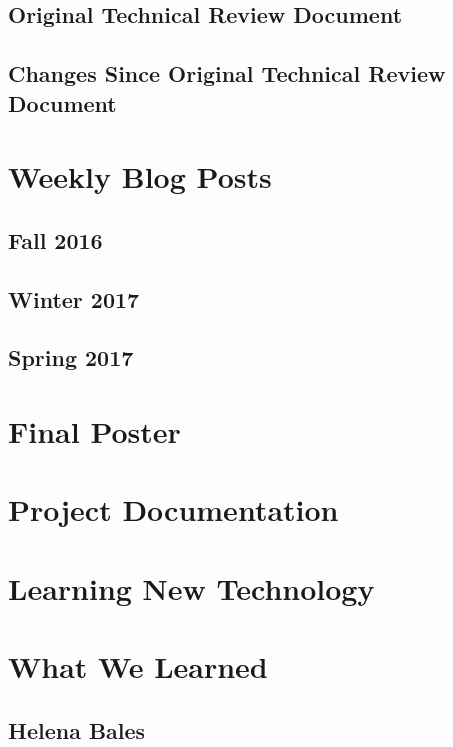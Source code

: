 \documentclass[letterpaper,10pt]{article}
\begin{document}
\subsection{Original Technical Review Document}


\subsection{Changes Since Original Technical Review Document}


\section{Weekly Blog Posts}
\subsection{Fall 2016}


\subsection{Winter 2017}


\subsection{Spring 2017}


\clearpage
\section{Final Poster}
\clearpage 

\section{Project Documentation}


\section{Learning New Technology}


\section{What We Learned}
\subsection{Helena Bales}

\end{document}
